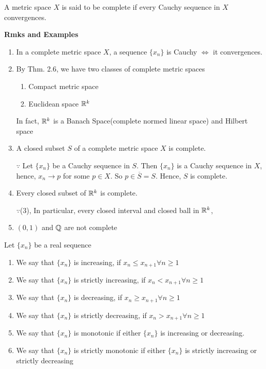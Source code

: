 \begin{defn}
	A metric space $X$	is said to be complete if every Cauchy sequence in $X$ convergences. 
\end{defn}

\textbf{Rmks and Examples}

\begin{enumerate}[wide]
	\item In a complete metric space $X$, a sequence $\{x_n\}$ is Cauchy $\Leftrightarrow$ it convergences.
	\item By Thm. 2.6, we have two classes of complete metric spaces
	\begin{enumerate}[label = $\bullet$]
		\item Compact metric space
		\item Euclidean space $\mathbb{R}^k$
	\end{enumerate}
	
	In fact, $\mathbb{R}^k$ is a Banach Space(complete normed linear space) and Hilbert space
	\item A closed subset $S$ of a complete metric space $X$ is complete.
	
	$\because$ Let $\{x_n\}$ be a Cauchy sequence in $S$. Then $\{x_n\}$ is a Cauchy sequence in $X$, hence, $x_n \rightarrow p$ for some $p \in X$. So $p \in \overline{S} = S$. Hence, $S$ is complete.
	\item Every closed subset of $\mathbb{R}^k$ is complete.
	
	$\because$(3), In particular, every closed interval and closed ball in $\mathbb{R}^k$,
	
	\item $(0,1)$ and $\mathbb{Q}$ are not complete

\end{enumerate}


\begin{defn}
	Let $\{x_n\}$ be a real sequence
	
	\begin{enumerate}[wide, label = $(\roman*)$]
		\item We say that $\{x_n\}$ is increasing, if $x_n \leq x_{n+1} \forall n \geq 1$
		\item We say that $\{x_n\}$ is strictly increasing, if $x_n < x_{n+1} \forall n \geq 1$
		\item We say that $\{x_n\}$ is decreasing, if $x_n \geq x_{n+1} \forall n \geq 1$
		\item We say that $\{x_n\}$ is strictly decreasing, if $x_n > x_{n+1} \forall n \geq 1$
		\item We say that $\{x_n\}$ is monotonic if either $\{x_n\}$ is increasing or decreasing.
		\item We say that $\{x_n\}$ is strictly monotonic if either $\{x_n\}$ is strictly increasing or strictly decreasing
	\end{enumerate}
	
\end{defn}


